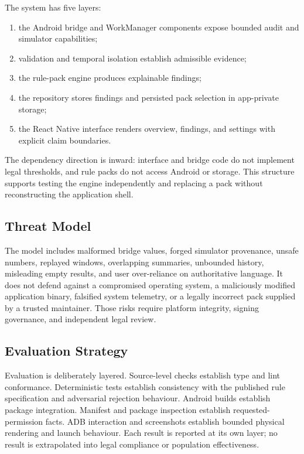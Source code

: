 The system has five layers:

\begin{enumerate}
    \item the Android bridge and WorkManager components expose bounded audit and simulator capabilities;
    \item validation and temporal isolation establish admissible evidence;
    \item the rule-pack engine produces explainable findings;
    \item the repository stores findings and persisted pack selection in app-private storage;
    \item the React Native interface renders overview, findings, and settings with explicit claim boundaries.
\end{enumerate}

The dependency direction is inward: interface and bridge code do not implement legal thresholds, and rule packs do not access Android or storage. This structure supports testing the engine independently and replacing a pack without reconstructing the application shell.

\subsection{Threat Model}

The model includes malformed bridge values, forged simulator provenance, unsafe numbers, replayed windows, overlapping summaries, unbounded history, misleading empty results, and user over-reliance on authoritative language. It does not defend against a compromised operating system, a maliciously modified application binary, falsified system telemetry, or a legally incorrect pack supplied by a trusted maintainer. Those risks require platform integrity, signing governance, and independent legal review.

\subsection{Evaluation Strategy}

Evaluation is deliberately layered. Source-level checks establish type and lint conformance. Deterministic tests establish consistency with the published rule specification and adversarial rejection behaviour. Android builds establish package integration. Manifest and package inspection establish requested-permission facts. ADB interaction and screenshots establish bounded physical rendering and launch behaviour. Each result is reported at its own layer; no result is extrapolated into legal compliance or population effectiveness.
